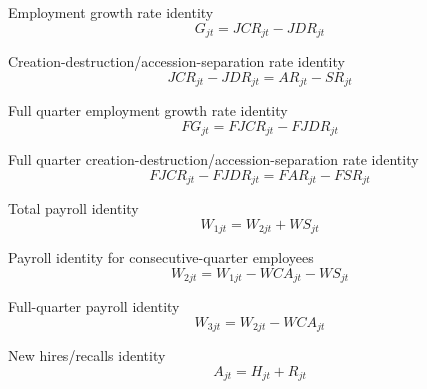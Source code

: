 \begin{definition}
Employment growth rate identity 
\begin{equation*}
G_{jt} = JCR_{jt} - JDR_{jt}
\end{equation*}
\end{definition}

\begin{definition}
Creation-destruction/accession-separation rate identity 
\begin{equation*}
JCR_{jt} - JDR_{jt} = AR_{jt} - SR_{jt}
\end{equation*}
\end{definition}

\begin{definition}
Full quarter employment growth rate identity 
\begin{equation*}
FG_{jt} = FJCR_{jt} - FJDR_{jt}
\end{equation*}
\end{definition}

\begin{definition}
Full quarter creation-destruction/accession-separation rate identity 
\begin{equation*}
FJCR_{jt} - FJDR_{jt} = FAR_{jt} - FSR_{jt}
\end{equation*}
\end{definition}

\begin{definition}
Total payroll identity 
\begin{equation*}
W_{1jt} = W_{2jt} + WS_{jt}
\end{equation*}
\end{definition}

\begin{definition}
Payroll identity for consecutive-quarter employees 
\begin{equation*}
W_{2jt} = W_{1jt} - WCA_{jt} - WS_{jt}
\end{equation*}
\end{definition}

\begin{definition}
Full-quarter payroll identity 
\begin{equation*}
W_{3jt} = W_{2jt} - WCA_{jt}
\end{equation*}
\end{definition}

\begin{definition}
New hires/recalls identity 
\begin{equation*}
A_{jt} = H_{jt} + R_{jt}
\end{equation*}
\end{definition}


